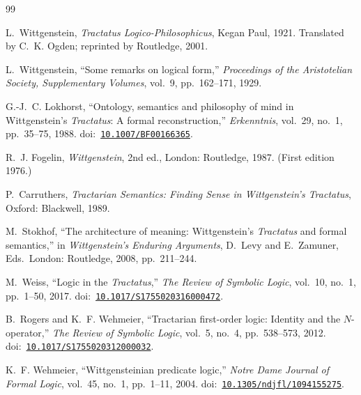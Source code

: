 \documentclass[jsl,bibother]{asl}
\theoremstyle{definition}
\theoremstyle{remark}
\begin{document}

\begin{thebibliography}{99}

L.~Wittgenstein,
\emph{Tractatus Logico-Philosophicus},
Kegan Paul, 1921.
Translated by C.~K. Ogden; reprinted by Routledge, 2001.

L.~Wittgenstein,
``Some remarks on logical form,''
\emph{Proceedings of the Aristotelian Society, Supplementary
Volumes}, vol.~9, pp.~162--171, 1929.

G.-J.~C. Lokhorst,
``Ontology, semantics and philosophy of mind in Wittgenstein's
\emph{Tractatus}: A formal reconstruction,''
\emph{Erkenntnis}, vol.~29, no.~1, pp.~35--75, 1988.
\newline doi:~\href{https://doi.org/10.1007/BF00166365}{\texttt{10.1007/BF00166365}}.

R.~J. Fogelin,
\emph{Wittgenstein}, 2nd ed.,
London: Routledge, 1987.
(First edition 1976.)

P.~Carruthers,
\emph{Tractarian Semantics: Finding Sense in Wittgenstein's
\emph{Tractatus}},
Oxford: Blackwell, 1989.

M.~Stokhof,
``The architecture of meaning: Wittgenstein's \emph{Tractatus} and
formal semantics,''
in \emph{Wittgenstein's Enduring Arguments},
D.~Levy and E.~Zamuner, Eds.\
London: Routledge, 2008, pp.~211--244.

M.~Weiss,
``Logic in the \emph{Tractatus},''
\emph{The Review of Symbolic Logic}, vol.~10, no.~1,
pp.~1--50, 2017.
\newline doi:~\href{https://doi.org/10.1017/S1755020316000472}{\texttt{10.1017/S1755020316000472}}.

B.~Rogers and K.~F. Wehmeier,
``Tractarian first-order logic: Identity and the $N$-operator,''
\emph{The Review of Symbolic Logic}, vol.~5, no.~4,
pp.~538--573, 2012.
\newline doi:~\href{https://doi.org/10.1017/S1755020312000032}{\texttt{10.1017/S1755020312000032}}.

K.~F. Wehmeier,
``Wittgensteinian predicate logic,''
\emph{Notre Dame Journal of Formal Logic}, vol.~45, no.~1,
pp.~1--11, 2004.
\newline doi:~\href{https://doi.org/10.1305/ndjfl/1094155275}{\texttt{10.1305/ndjfl/1094155275}}.


\end{thebibliography}
\end{document}
